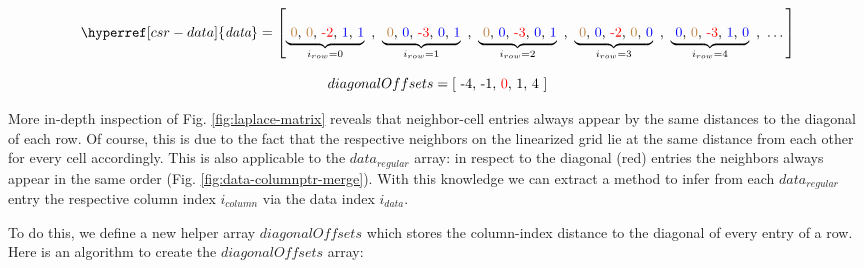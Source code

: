 \begin{figure*}
\centering
\[
	\hyperref[csr-data]{\textit{data}} = \left[ 
	\underbrace{\text{ \textcolor{brown}{0}, \textcolor{brown}{0}, \textcolor{red}{-2}, \textcolor{blue}{1}, \textcolor{blue}{1}}}_{i_{row} = 0} \text{ , }
	\underbrace{\text{ \textcolor{brown}{0}, \textcolor{blue}{0}, \textcolor{red}{-3}, \textcolor{blue}{0}, \textcolor{blue}{1}}}_{i_{row} = 1} \text{ , }
	\underbrace{\text{ \textcolor{brown}{0}, \textcolor{blue}{0}, \textcolor{red}{-3}, \textcolor{blue}{0}, \textcolor{blue}{1}}}_{i_{row} = 2} \text{ , }
	\underbrace{\text{ \textcolor{brown}{0}, \textcolor{blue}{0}, \textcolor{red}{-2}, \textcolor{brown}{0}, \textcolor{blue}{0}}}_{i_{row} = 3} \text{ , }
	\underbrace{\text{ \textcolor{blue}{0}, \textcolor{brown}{0}, \textcolor{red}{-3}, \textcolor{blue}{1}, \textcolor{blue}{0}}}_{i_{row} = 4} \text{ , }
	\dots
	\right]
\]
\caption{Vizualization of $data_{regular}$ array for Fig. \ref{fig:laplace-matrix}. Diagonal entries are printed in red. Neighbor cells are printed in blue if they are within the grid and brown otherwise.
}
\label{fig:data-columnptr-merge}
\end{figure*} 
\begin{figure*}
\centering
\[
	diagonalOffsets = \left[ \text{ -4, -1, \textcolor{red}{0}, 1, 4 } \right]
\]
\caption{$diagonalOffsets$ array that corresponds to Fig. \ref{fig:laplace-matrix}.}
\label{fig:data-columnptr-merge}
\end{figure*} 
More in-depth inspection of Fig. \ref{fig:laplace-matrix} reveals that neighbor-cell entries always appear by the same distances to the diagonal of each row. Of course, this is due to the fact that the respective neighbors on the linearized grid lie at the same distance from each other for every cell accordingly. This is also applicable to the $data_{regular}$ array: in respect to the diagonal (red) entries the neighbors always appear in the same order (Fig. \ref{fig:data-columnptr-merge}). With this knowledge we can extract a method to infer from each $data_{regular}$ entry the respective column index $i_{column}$ via the data index $i_{data}$. 
\par To do this, we define a new helper array $diagonalOffsets$ which stores the column-index distance to the diagonal of every entry of a row.
Here is an algorithm to create the $diagonalOffsets$ array:

